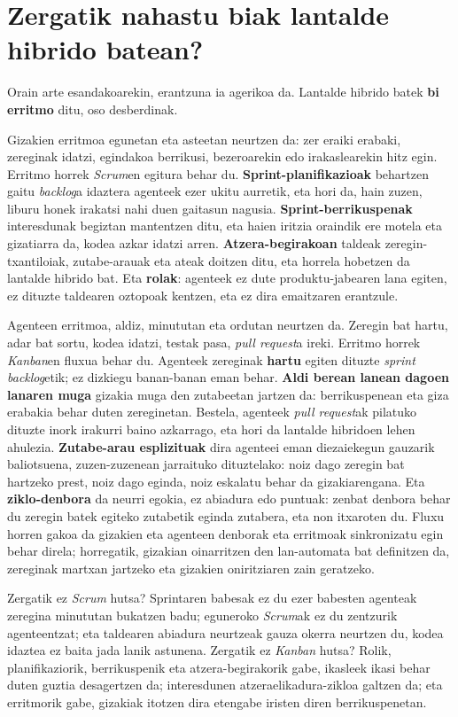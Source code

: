 \section{Zergatik nahastu biak lantalde hibrido batean?}

Orain arte esandakoarekin, erantzuna ia agerikoa da.
Lantalde hibrido batek \textbf{bi erritmo} ditu, oso desberdinak.

Gizakien erritmoa egunetan eta asteetan neurtzen da: zer eraiki erabaki, zereginak idatzi, egindakoa berrikusi, bezeroarekin edo irakaslearekin hitz egin.
Erritmo horrek \textit{Scrum}en egitura behar du.
\textbf{Sprint-planifikazioak} behartzen gaitu \textit{backlog}a idaztera agenteek ezer ukitu aurretik, eta hori da, hain zuzen, liburu honek irakatsi nahi duen gaitasun nagusia.
\textbf{Sprint-berrikuspenak} interesdunak begiztan mantentzen ditu, eta haien iritzia oraindik ere motela eta gizatiarra da, kodea azkar idatzi arren.
\textbf{Atzera-begirakoan} taldeak zeregin-txantiloiak, zutabe-arauak eta ateak doitzen ditu, eta horrela hobetzen da lantalde hibrido bat.
Eta \textbf{rolak}: agenteek ez dute produktu-jabearen lana egiten, ez dituzte taldearen oztopoak kentzen, eta ez dira emaitzaren erantzule.

Agenteen erritmoa, aldiz, minututan eta ordutan neurtzen da.
Zeregin bat hartu, adar bat sortu, kodea idatzi, testak pasa, \textit{pull request}a ireki.
Erritmo horrek \textit{Kanban}en fluxua behar du.
Agenteek zereginak \textbf{hartu} egiten dituzte \textit{sprint backlog}etik; ez dizkiegu banan-banan eman behar.
\textbf{Aldi berean lanean dagoen lanaren muga} gizakia muga den zutabeetan jartzen da: berrikuspenean eta giza erabakia behar duten zereginetan.
Bestela, agenteek \textit{pull request}ak pilatuko dituzte inork irakurri baino azkarrago, eta hori da lantalde hibridoen lehen ahulezia.
\textbf{Zutabe-arau esplizituak} dira agenteei eman diezaiekegun gauzarik baliotsuena, zuzen-zuzenean jarraituko dituztelako: noiz dago zeregin bat hartzeko prest, noiz dago eginda, noiz eskalatu behar da gizakiarengana.
Eta \textbf{ziklo-denbora} da neurri egokia, ez abiadura edo puntuak: zenbat denbora behar du zeregin batek egiteko zutabetik eginda zutabera, eta non itxaroten du.
Fluxu horren gakoa da gizakien eta agenteen denborak eta erritmoak sinkronizatu egin behar direla; horregatik, gizakian oinarritzen den lan-automata bat definitzen da, zereginak martxan jartzeko eta gizakien oniritziaren zain geratzeko.

Zergatik ez \textit{Scrum} hutsa?
Sprintaren babesak ez du ezer babesten agenteak zeregina minututan bukatzen badu; eguneroko \textit{Scrum}ak ez du zentzurik agenteentzat; eta taldearen abiadura neurtzeak gauza okerra neurtzen du, kodea idaztea ez baita jada lanik astunena.
Zergatik ez \textit{Kanban} hutsa?
Rolik, planifikaziorik, berrikuspenik eta atzera-begirakorik gabe, ikasleek ikasi behar duten guztia desagertzen da; interesdunen atzeraelikadura-zikloa galtzen da; eta erritmorik gabe, gizakiak itotzen dira etengabe iristen diren berrikuspenetan.

